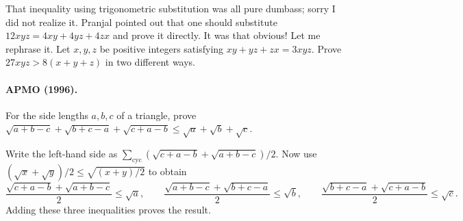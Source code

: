 \documentclass[11pt,a4paper]{article}
\begin{document}
That inequality using trigonometric substitution was all pure dumbass; sorry I did not realize it.
Pranjal pointed out that one should substitute
$12xyz=4xy+4yz+4zx$ and prove it directly. It was that obvious!
Let me rephrase it.
Let $x,y,z$ be positive integers satisfying $xy+yz+zx=3xyz$.
Prove $27xyz>8(x+y+z)$ in two different ways.

\paragraph{APMO (1996).}
For the side lengths $a,b,c$ of a triangle, prove
$\sqrt{a+b-c}+\sqrt{b+c-a}+\sqrt{c+a-b}\leq\sqrt a+\sqrt b+\sqrt c$.

Write the left-hand side as
$\sum_{\mathrm{cyc}}(\sqrt{c+a-b}+\sqrt{a+b-c})/2$.
Now use $(\sqrt x+\sqrt y)/2\leq\sqrt{(x+y)/2}$ to obtain
\[
\frac{\sqrt{c+a-b}+\sqrt{a+b-c}}2\leq\sqrt a,\qquad
\frac{\sqrt{a+b-c}+\sqrt{b+c-a}}2\leq\sqrt b,\qquad
\frac{\sqrt{b+c-a}+\sqrt{c+a-b}}2\leq\sqrt c.
\]
Adding these three inequalities proves the result.
\end{document}
